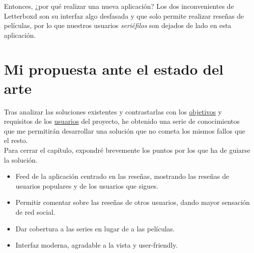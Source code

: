 Entonces, ¿por qué realizar una nueva aplicación? Los dos inconvenientes de Letterboxd son su interfaz algo desfasada
y que solo permite realizar reseñas de películas, por lo que nuestros usuarios \textit{seriéfilos} son dejados de lado
en esta aplicación.

\section{Mi propuesta ante el estado del arte}
Tras analizar las soluciones existentes y contrastarlas con los \hyperref[sec:objetivo]{objetivos} y requisitos de los
\hyperref[chap:personas]{usuarios} del proyecto, he obtenido una serie de conocimientos que me permitirán desarrollar
una solución que no cometa los mismos fallos que el resto. \\

Para cerrar el capítulo, expondré brevemente los puntos por los que ha de guiarse la solución. 

\begin{itemize}
    \item Feed de la aplicación centrado en las reseñas, mostrando las reseñas de usuarios populares y de los usuarios
    que sigues.
    \item Permitir comentar sobre las reseñas de otros usuarios, dando mayor sensación de red social.
    \item Dar cobertura a las series en lugar de a las películas.
    \item Interfaz moderna, agradable a la vista y user-friendly.
\end{itemize}
